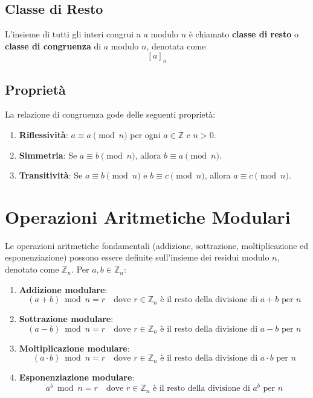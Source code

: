 \documentclass[a4paper,12pt]{report}
\begin{document}
\subsection*{Classe di Resto}
L'insieme di tutti gli interi congrui a $a$ modulo $n$ è chiamato \textbf{classe di resto} o \textbf{classe di congruenza} di $a$ modulo $n$, denotata come \[[a]_n\]

\subsection*{Proprietà}
La relazione di congruenza gode delle seguenti proprietà:

\begin{enumerate}
    \item \textbf{Riflessività}: $a \equiv a \pmod{n}$ per ogni $a \in \mathbb{Z}$ e $n > 0$.
    \item \textbf{Simmetria}: Se $a \equiv b \pmod{n}$, allora $b \equiv a \pmod{n}$.
    \item \textbf{Transitività}: Se $a \equiv b \pmod{n}$ e $b \equiv c \pmod{n}$, allora $a \equiv c \pmod{n}$.
\end{enumerate}
\newpage
\section{Operazioni Aritmetiche Modulari}
Le operazioni aritmetiche fondamentali (addizione, sottrazione, moltiplicazione ed esponenziazione) possono essere definite sull'insieme dei residui modulo $n$, denotato come $\mathbb{Z}_n$. Per $a, b \in \mathbb{Z}_n$:

\begin{enumerate}
    \item \textbf{Addizione modulare}:
    $$(a + b) \bmod n = r \quad \text{dove } r \in \mathbb{Z}_n \text{ è il resto della divisione di } a+b \text{ per } n$$
    
    \item \textbf{Sottrazione modulare}:
    $$(a - b) \bmod n = r \quad \text{dove } r \in \mathbb{Z}_n \text{ è il resto della divisione di } a-b \text{ per } n$$
    
    \item \textbf{Moltiplicazione modulare}:
    $$(a \cdot b) \bmod n = r \quad \text{dove } r \in \mathbb{Z}_n \text{ è il resto della divisione di } a \cdot b \text{ per } n$$
    
    \item \textbf{Esponenziazione modulare}:
    $$a^b \bmod n = r \quad \text{dove } r \in \mathbb{Z}_n \text{ è il resto della divisione di } a^b \text{ per } n$$
\end{enumerate}
\end{document}

